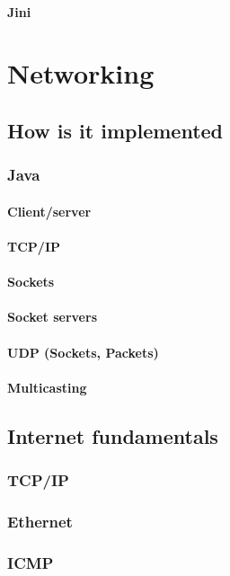 \documentclass[a4paper,oneside]{report}
\begin{document}
      		\subsubsection{Jini}
      		
      		
\chapter{Networking}
  	\section{How is it implemented}
    	\subsection{Java}
      		\subsubsection{Client/server}
      		\subsubsection{TCP/IP}
        	\subsubsection{Sockets}
        	\subsubsection{Socket servers}
      		\subsubsection{UDP (Sockets, Packets)}
      		\subsubsection{Multicasting}
 	\section{Internet fundamentals}
    	\subsection{TCP/IP}
    	\subsection{Ethernet}
    	\subsection{ICMP}
\end{document}
